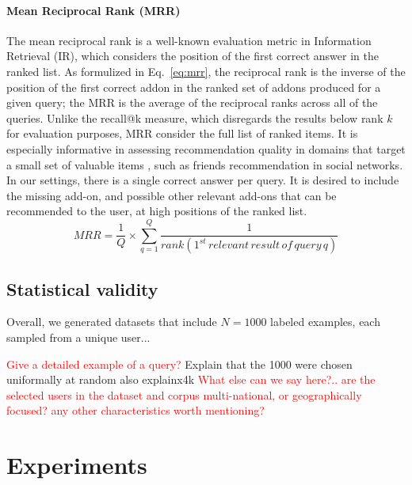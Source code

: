 \documentclass[11pt,oneside]{book}
\let\Oldsection\section
\renewcommand{\section}{\FloatBarrier\Oldsection}
\let\Oldsubsection\subsection
\renewcommand{\subsection}{\FloatBarrier\Oldsubsection}
\begin{document}
\paragraph{Mean Reciprocal Rank (MRR)}

The mean reciprocal rank \citep{voorhees1999trec} is a
well-known evaluation metric in Information Retrieval (IR), which considers the position of the first correct
answer in the ranked list.  As formulized in Eq.~\eqref{eq:mrr}, the reciprocal rank is the inverse of the position of the first correct addon in the ranked set of addons produced for a given query; the MRR is the average of the reciprocal ranks across all of the queries. Unlike the recall@k measure, which disregards the results below rank $k$ for evaluation purposes, MRR consider the full list of ranked items. It is especially informative in assessing recommendation quality in domains that target a small set of valuable items \citep{chen2006less}, such as friends recommendation in social
networks. In our settings, there is a single correct answer per query. It is desired to include the missing add-on, and possible other relevant add-ons that can be recommended to the user, at high positions of the ranked list.
\begin{equation}
 MRR = \frac{1}{Q} \times \displaystyle\sum\limits_{q=1}^{Q} \frac{1}{rank(1^{st} \, relevant \, result \, of \, query \, q)}
\label{eq:mrr}
\end{equation}

\subsection{Statistical validity}

Overall, we generated datasets that include $N=1000$ labeled examples, each sampled from a unique user...

\textcolor{red}{Give a detailed example of a query?}
Explain that the 1000 were chosen uniformally at random
also explainx4k
\textcolor{red}{What else can we say here?.. are the selected users in
  the dataset and corpus multi-national, or geographically focused?
  any other characteristics worth mentioning?}

\section{Experiments}
\label{sec:experiments}
\end{document}

